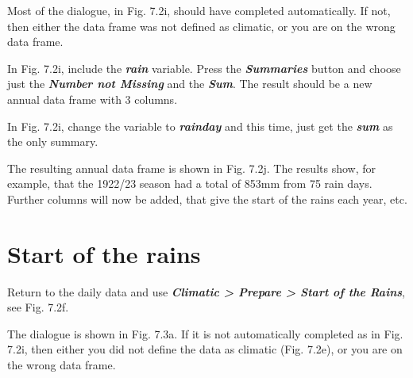 \documentclass[
  letterpaper,
  DIV=11,
  numbers=noendperiod]{scrreprt}
\begin{document}
Most of the dialogue, in Fig. 7.2i, should have completed automatically.
If not, then either the data frame was not defined as climatic, or you
are on the wrong data frame.

In Fig. 7.2i, include the \textbf{\emph{rain}} variable. Press the
\textbf{\emph{Summaries}} button and choose just the
\textbf{\emph{Number not Missing}} and the \textbf{\emph{Sum}}. The
result should be a new annual data frame with 3 columns.

In Fig. 7.2i, change the variable to \textbf{\emph{rainday}} and this
time, just get the \textbf{\emph{sum}} as the only summary.

The resulting annual data frame is shown in Fig. 7.2j. The results show,
for example, that the 1922/23 season had a total of 853mm from 75 rain
days. Further columns will now be added, that give the start of the
rains each year, etc.

\section{\texorpdfstring{\textbf{Start of the
rains}}{Start of the rains}}\label{start-of-the-rains}

Return to the daily data and use \textbf{\emph{Climatic \textgreater{}
Prepare \textgreater{} Start of the Rains}}, see Fig. 7.2f.

The dialogue is shown in Fig. 7.3a. If it is not automatically completed
as in Fig. 7.2i, then either you did not define the data as climatic
(Fig. 7.2e), or you are on the wrong data frame.
\end{document}
